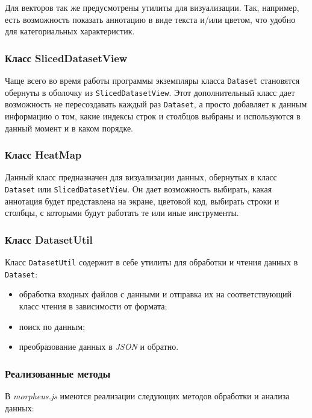 Для векторов так же предусмотрены утилиты для визуализации. Так, например, есть возможность показать аннотацию в виде текста и/или цветом, что удобно для категориальных характеристик. 

\subsubsection{Класс SlicedDatasetView}
Чаще всего во время работы программы экземпляры класса \texttt{Dataset} становятся обернуты в оболочку из \texttt{SlicedDatasetView}. Этот дополнительный класс дает возможность не пересоздавать каждый раз \texttt{Dataset}, а просто добавляет к данным информацию о том, какие индексы строк и столбцов выбраны и используются в данный момент и в каком порядке.

\subsubsection{Класс HeatMap}
Данный класс предназначен для визуализации данных, обернутых в класс \texttt{Dataset} или \texttt{SlicedDatasetView}. Он дает возможность выбирать, какая аннотация будет представлена на экране, цветовой код, выбирать строки и столбцы, с которыми будут работать те или иные инструменты.

\subsubsection{Класс DatasetUtil}
Класс \texttt{DatasetUtil} содержит в себе утилиты для обработки и чтения данных в \texttt{Dataset}:\begin{itemize}
\item обработка входных файлов с данными и отправка их на соответствующий класс чтения в зависимости от формата;
\item поиск по данным;
\item преобразование данных в \emph{JSON} и обратно.
\end{itemize}

\subsubsection{Реализованные методы}
В \emph{morpheus.js} имеются реализации следующих методов обработки и анализа данных:

